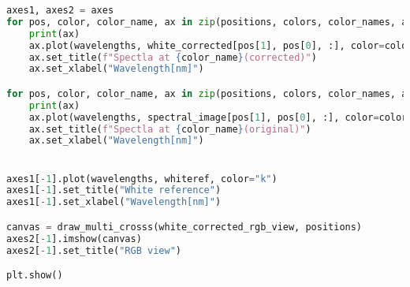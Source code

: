 \begin{lstlisting}[language=python, caption=White correction for Nuance Cmaera with large reference, label={code:wc-nuance-large}]
axes1, axes2 = axes
for pos, color, color_name, ax in zip(positions, colors, color_names, axes2):
    print(ax)
    ax.plot(wavelengths, white_corrected[pos[1], pos[0], :], color=color)
    ax.set_title(f"Spectla at {color_name}(corrected)")
    ax.set_xlabel("Wavelength[nm]")

for pos, color, color_name, ax in zip(positions, colors, color_names, axes1):
    print(ax)
    ax.plot(wavelengths, spectral_image[pos[1], pos[0], :], color=color)
    ax.set_title(f"Spectla at {color_name}(original)")
    ax.set_xlabel("Wavelength[nm]")


axes1[-1].plot(wavelengths, whiteref, color="k")
axes1[-1].set_title("White reference")
axes1[-1].set_xlabel("Wavelength[nm]")

canvas = draw_multi_crosss(white_corrected_rgb_view, positions)
axes2[-1].imshow(canvas)
axes2[-1].set_title("RGB view")

plt.show()

\end{lstlisting}
